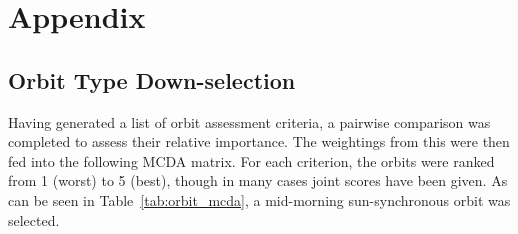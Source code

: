 \documentclass[a4paper, 11pt, conference]{IEEEtran}
\begin{document}
\section{Appendix}

\subsection{Orbit Type Down-selection}
\label{subsec:orbit_downselection}
Having generated a list of orbit assessment criteria, a pairwise comparison was completed to assess their relative importance. The weightings from this were then fed into the following MCDA matrix. For each criterion, the orbits were ranked from 1 (worst) to 5 (best), though in many cases joint scores have been given. As can be seen in Table~\ref{tab:orbit_mcda}, a mid-morning sun-synchronous orbit was selected. 
\end{document}

